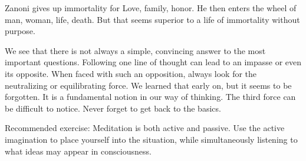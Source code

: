 Zanoni gives up immortality for Love, family, honor. He then enters the wheel of man, woman, life, death. But that seems superior to a life of immortality without purpose.

We see that there is not always a simple, convincing answer to the most important questions. Following one line of thought can lead to an impasse or even its opposite. When faced with such an opposition, always look for the neutralizing or equilibrating force. We learned that early on, but it seems to be forgotten. It is a fundamental notion in our way of thinking. The third force can be difficult to notice. Never forget to get back to the basics.

Recommended exercise: Meditation is both active and passive. Use the active imagination to place yourself into the situation, while simultaneously listening to what ideas may appear in consciousness.



